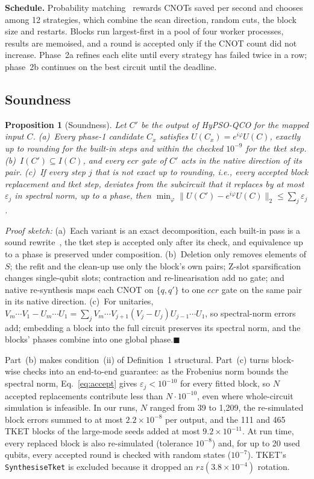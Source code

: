\documentclass[conference,letterpaper]{IEEEtran}
\newcommand{\tool}[1]{\texttt{#1}}
\newcommand{\hypso}{HyPSO-QCO}
\newtheorem{proposition}{Proposition}
\begin{document}
\textbf{Schedule.} Probability matching~\cite{thierens2005} rewards CNOTs saved per second and chooses among
12 strategies, which combine the scan direction, random cuts, the block size and restarts. Blocks run
largest-first in a pool of four worker processes, results are memoised, and a round is accepted only if the
CNOT count did not increase. Phase~2a refines each elite until every strategy has failed twice in a row;
phase~2b continues on the best circuit until the deadline.

\subsection{Soundness}
\begin{proposition}[Soundness]\label{prop:sound}
Let $C'$ be the output of \hypso{} for the mapped input $C$. (a)~Every phase-1 candidate $C_x$ satisfies
$U(C_x) = e^{i\varphi}U(C)$, exactly up to rounding for the built-in steps and within the checked $10^{-9}$
for the tket step. (b)~$I(C')\subseteq I(C)$, and every $ecr$ gate of $C'$ acts in the native direction of
its pair. (c)~If every step $j$ that is not exact up to rounding, i.e., every accepted block replacement and
tket step, deviates from the subcircuit that it replaces by at most $\varepsilon_j$ in spectral norm, up to a
phase, then $\min_\varphi\|U(C') - e^{i\varphi}U(C)\|_2 \le \sum_j \varepsilon_j$.
\end{proposition}

\emph{Proof sketch:} (a)~Each variant is an exact decomposition, each built-in pass is a sound
rewrite~\cite{shende2004,nam2018}, the tket step is accepted only after its check, and equivalence up to a
phase is preserved under composition. (b)~Deletion only removes elements of $S$; the refit and the clean-up
use only the block's own pairs; Z-slot sparsification changes single-qubit slots; contraction and
re-linearisation add no gate; and native re-synthesis maps each CNOT on $\{q, q'\}$ to one $ecr$ gate on the
same pair in its native direction. (c)~For unitaries,
$V_m\cdots V_1 - U_m\cdots U_1 = \sum_j V_m\cdots V_{j+1}(V_j - U_j)U_{j-1}\cdots U_1$, so spectral-norm
errors add; embedding a block into the full circuit preserves its spectral norm, and the blocks' phases
combine into one global phase.\hfill$\blacksquare$

Part~(b) makes condition~(ii) of Definition~1 structural. Part~(c) turns block-wise checks into an
end-to-end guarantee: as the Frobenius norm bounds the spectral norm, Eq.~\eqref{eq:accept} gives
$\varepsilon_j < 10^{-10}$ for every fitted block, so $N$ accepted replacements contribute less than
$N\cdot10^{-10}$, even where whole-circuit simulation is infeasible. In our runs, $N$ ranged from 39 to 1,209,
the re-simulated block errors summed to at most $2.2\times10^{-8}$ per output, and the 111 and 465 TKET blocks
of the large-mode seeds added at most $9.2\times10^{-11}$. At run time, every replaced block is also
re-simulated (tolerance $10^{-8}$) and, for up to 20 used qubits, every accepted round is checked with random
states ($10^{-7}$). TKET's \tool{SynthesiseTket} is excluded because it dropped an $rz(3.8\times10^{-4})$
rotation.
\end{document}
